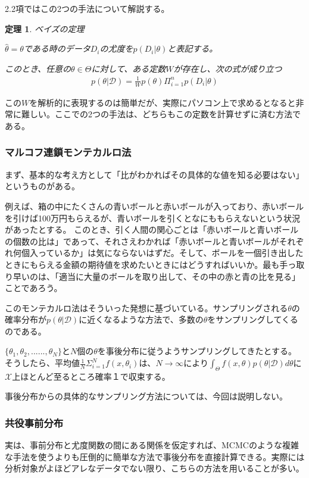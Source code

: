 \documentclass[dvipdfmx, a4paper]{jsarticle}
\newtheorem{theo}{定理}[section]
\begin{document}
2.2項ではこの2つの手法について解説する。

\begin{theo}ベイズの定理

$\hat{\theta}=\theta$である時のデータ$D_i$の尤度を$p(D_i|\theta)$と表記する。

このとき、任意の$\theta\in\Theta$に対して、ある定数$W$が存在し、次の式が成り立つ
\begin{align}
p(\theta|\mathcal{D})=\frac{1}{W}p(\theta)\Pi^n_{i=1}p(D_i|\theta)
\end{align}
\end{theo}
この$W$を解析的に表現するのは簡単だが、実際にパソコン上で求めるとなると非常に難しい。ここでの2つの手法は、どちらもこの定数を計算せずに済む方法である。
\subsubsection{マルコフ連鎖モンテカルロ法}
まず、基本的な考え方として「比がわかればその具体的な値を知る必要はない」というものがある。

例えば、箱の中にたくさんの青いボールと赤いボールが入っており、赤いボールを引けば100万円もらえるが、青いボールを引くとなにももらえないという状況があったとする。
このとき、引く人間の関心ごとは「赤いボールと青いボールの個数の比は」であって、それさえわかれば「赤いボールと青いボールがそれぞれ何個入っているか」は気にならないはずだ。そして、ボールを一個引き出したときにもらえる金額の期待値を求めたいときにはどうすればいいか。最も手っ取り早いのは、「適当に大量のボールを取り出して、その中の赤と青の比を見る」ことであろう。

このモンテカルロ法はそういった発想に基づいている。サンプリングされる$\theta$の確率分布が$p(\theta|\mathcal{D})$に近くなるような方法で、多数の$\theta$をサンプリングしてくるのである。

$\{\theta_1,\theta_2,......,\theta_N\}$と$N$個の$\theta$を事後分布に従うようサンプリングしてきたとする。そうしたら、平均値$\frac{1}{N}\Sigma^N_{i=1}f(x,\theta_i)$は、$N\to\infty$により$\int_\Theta f(x,\theta)p(\theta|\mathcal{D})d\theta$に$\mathcal{X}$上ほとんど至るところ確率１で収束する。

事後分布からの具体的なサンプリング方法については、今回は説明しない。


\subsubsection{共役事前分布}
実は、事前分布と尤度関数の間にある関係を仮定すれば、MCMCのような複雑な手法を使うよりも圧倒的に簡単な方法で事後分布を直接計算できる。実際には分析対象がよほどアレなデータでない限り、こちらの方法を用いることが多い。
\end{document}
